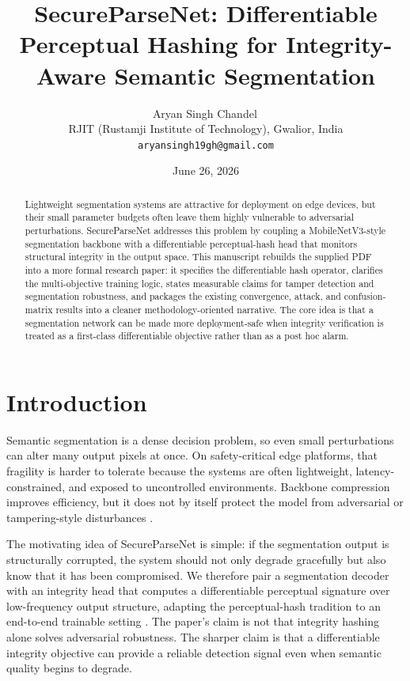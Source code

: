 \documentclass[11pt]{article}
\title{SecureParseNet: Differentiable Perceptual Hashing for Integrity-Aware Semantic Segmentation}
\author{Aryan Singh Chandel\,\orcidlink{0009-0007-1774-2480}\\
RJIT (Rustamji Institute of Technology), Gwalior, India\\
\texttt{aryansingh19gh@gmail.com}}
\date{June 26, 2026}
\begin{document}
\maketitle

\begin{abstract}
Lightweight segmentation systems are attractive for deployment on edge devices, but their small parameter budgets often leave them highly vulnerable to adversarial perturbations. SecureParseNet addresses this problem by coupling a MobileNetV3-style segmentation backbone with a differentiable perceptual-hash head that monitors structural integrity in the output space. This manuscript rebuilds the supplied PDF into a more formal research paper: it specifies the differentiable hash operator, clarifies the multi-objective training logic, states measurable claims for tamper detection and segmentation robustness, and packages the existing convergence, attack, and confusion-matrix results into a cleaner methodology-oriented narrative. The core idea is that a segmentation network can be made more deployment-safe when integrity verification is treated as a first-class differentiable objective rather than as a post hoc alarm.
\end{abstract}

\section{Introduction}
Semantic segmentation is a dense decision problem, so even small perturbations can alter many output pixels at once. On safety-critical edge platforms, that fragility is harder to tolerate because the systems are often lightweight, latency-constrained, and exposed to uncontrolled environments. Backbone compression improves efficiency, but it does not by itself protect the model from adversarial or tampering-style disturbances \citep{howard2019mobilenetv3,goodfellow2015explaining}.

The motivating idea of SecureParseNet is simple: if the segmentation output is structurally corrupted, the system should not only degrade gracefully but also know that it has been compromised. We therefore pair a segmentation decoder with an integrity head that computes a differentiable perceptual signature over low-frequency output structure, adapting the perceptual-hash tradition to an end-to-end trainable setting \citep{zauner2010implementation}. The paper's claim is not that integrity hashing alone solves adversarial robustness. The sharper claim is that a differentiable integrity objective can provide a reliable detection signal even when semantic quality begins to degrade.
\end{document}

